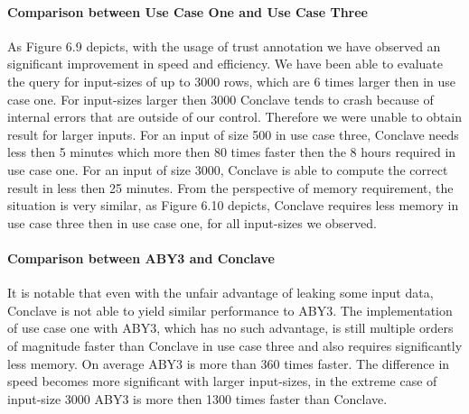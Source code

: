 \paragraph{Comparison between Use Case One and Use Case Three}
As Figure 6.9 depicts, with the usage of trust annotation we have observed an significant improvement in speed and efficiency. We have been able to evaluate the query for input-sizes of up to 3000 rows, which are 6 times larger then in use case one. For input-sizes larger then 3000 Conclave tends to crash because of internal errors that are outside of our control. Therefore we were unable to obtain result for larger inputs.  For an input of size 500 in use case three, Conclave needs less then 5 minutes which more then 80 times faster then the 8 hours required in use case one. For an input of size 3000, Conclave is able to compute the correct result in less then 25 minutes. From the perspective of memory requirement, the situation is very similar, as Figure 6.10 depicts, Conclave requires less memory in use case three then in use case one, for all input-sizes we observed. 

\paragraph{Comparison between ABY3 and Conclave}
It is notable that even with the unfair advantage of leaking some input data, Conclave is not able to yield similar performance to ABY3. The implementation of use case one with ABY3, which has no such advantage, is still multiple orders of magnitude faster than Conclave in use case three and also requires significantly less memory. On average ABY3 is more than 360 times faster. The difference in speed becomes more significant with larger input-sizes, in the extreme case of input-size 3000 ABY3 is more then 1300 times faster than Conclave. 



